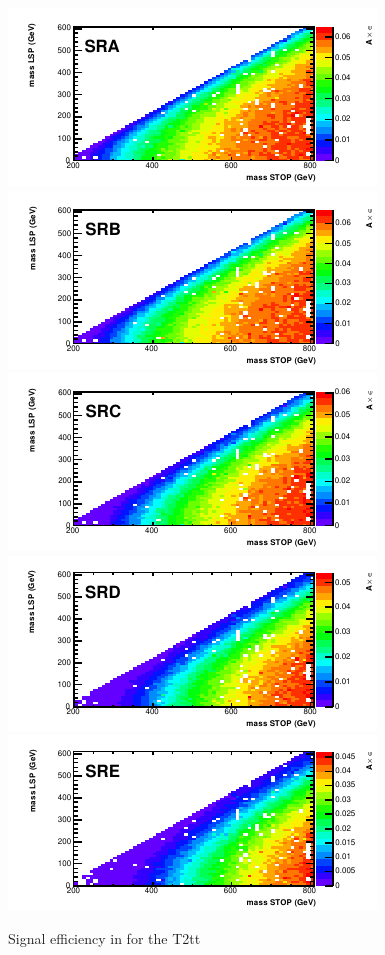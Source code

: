 \begin{figure}[hbt]
  \begin{center}
        \includegraphics[width=0.5\linewidth]{plots/stopPlot/massesA_eff.pdf}%
        \includegraphics[width=0.5\linewidth]{plots/stopPlot/massesB_eff.pdf}
        \includegraphics[width=0.5\linewidth]{plots/stopPlot/massesC_eff.pdf}%
        \includegraphics[width=0.5\linewidth]{plots/stopPlot/massesD_eff.pdf}
        \includegraphics[width=0.5\linewidth]{plots/stopPlot/massesE_eff.pdf}%
    \caption{Signal efficiency in for the T2tt }
\label{fig:SigEff}
      \end{center}
\end{figure}

